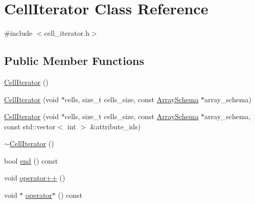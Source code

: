 \hypertarget{classCellIterator}{}\section{Cell\+Iterator Class Reference}
\label{classCellIterator}


{\ttfamily \#include $<$cell\+\_\+iterator.\+h$>$}

\subsection*{Public Member Functions}
\begin{DoxyCompactItemize}
\item 
\hyperlink{classCellIterator_a53fa89d3bd280aaf6c5083f0cda9bed4}{Cell\+Iterator} ()
\item 
\hyperlink{classCellIterator_aef0e96372f890cc716b97b2050632278}{Cell\+Iterator} (void $\ast$cells, size\+\_\+t cells\+\_\+size, const \hyperlink{classArraySchema}{Array\+Schema} $\ast$array\+\_\+schema)
\item 
\hyperlink{classCellIterator_ad149ca0beeb5a556d6958a4d9cdbadc3}{Cell\+Iterator} (void $\ast$cells, size\+\_\+t cells\+\_\+size, const \hyperlink{classArraySchema}{Array\+Schema} $\ast$array\+\_\+schema, const std\+::vector$<$ int $>$ \&attribute\+\_\+ids)
\item 
\hyperlink{classCellIterator_a72cfbed183ce5a840ba0ca498624fe90}{$\sim$\+Cell\+Iterator} ()
\item 
bool \hyperlink{classCellIterator_a42dc71d64d9501f003064c7f17111b46}{end} () const 
\item 
void \hyperlink{classCellIterator_a39b8174230f8e70463575e08fc092218}{operator++} ()
\item 
void $\ast$ \hyperlink{classCellIterator_ac940c1b8d0999de4eb0b7ffd6a9dea3f}{operator$\ast$} () const 
\end{DoxyCompactItemize}
